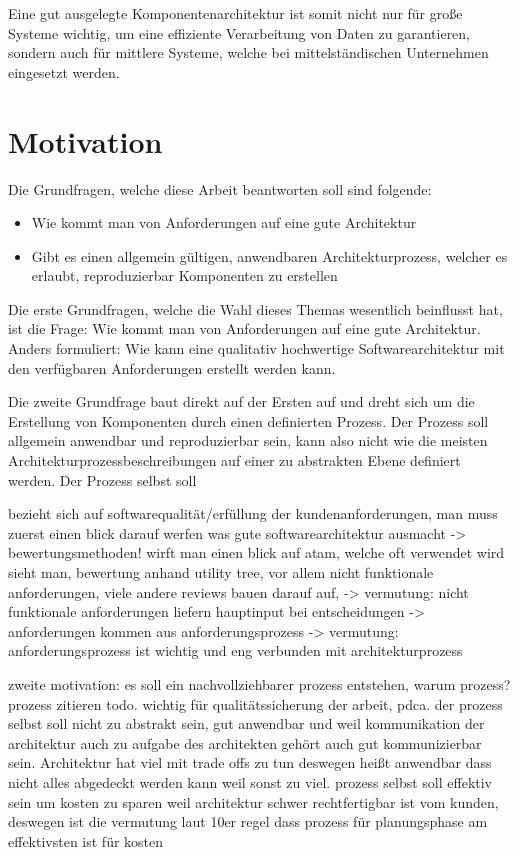 Eine gut ausgelegte Komponentenarchitektur ist somit nicht nur für große Systeme wichtig, um eine effiziente Verarbeitung von Daten zu garantieren, sondern auch für mittlere Systeme, welche bei mittelständischen Unternehmen eingesetzt werden.

\section{Motivation}
Die Grundfragen, welche diese Arbeit beantworten soll sind folgende:

\begin{itemize}
  \item Wie kommt man von Anforderungen auf eine gute Architektur
  \item Gibt es einen allgemein gültigen, anwendbaren Architekturprozess, welcher es erlaubt, reproduzierbar Komponenten zu erstellen
\end{itemize}

Die erste Grundfragen, welche die Wahl dieses Themas wesentlich beinflusst hat, ist die Frage: Wie kommt man von Anforderungen auf eine gute Architektur. Anders formuliert: Wie kann eine qualitativ hochwertige Softwarearchitektur mit den verfügbaren Anforderungen erstellt werden kann.

Die zweite Grundfrage baut direkt auf der Ersten auf und dreht sich um die Erstellung von Komponenten durch einen definierten Prozess. Der Prozess soll allgemein anwendbar und reproduzierbar sein, kann also nicht wie die meisten Architekturprozessbeschreibungen auf einer zu abstrakten Ebene definiert werden. Der Prozess selbst soll

bezieht sich auf softwarequalität/erfüllung der kundenanforderungen, man muss zuerst einen blick darauf werfen was gute softwarearchitektur ausmacht -> bewertungsmethoden! wirft man einen blick auf atam, welche oft verwendet wird sieht man, bewertung anhand utility tree, vor allem nicht funktionale anforderungen, viele andere reviews bauen darauf auf, -> vermutung: nicht funktionale anforderungen liefern hauptinput bei entscheidungen -> anforderungen kommen aus anforderungsprozess -> vermutung: anforderungsprozess ist wichtig und eng verbunden mit architekturprozess


zweite motivation: es soll ein nachvollziehbarer prozess entstehen, warum prozess? prozess zitieren todo. wichtig für qualitätssicherung der arbeit, pdca. der prozess selbst soll nicht zu abstrakt sein, gut anwendbar und weil kommunikation der architektur auch zu aufgabe des architekten gehört auch gut kommunizierbar sein. Architektur hat viel mit trade offs zu tun deswegen heißt anwendbar dass nicht alles abgedeckt werden kann weil sonst zu viel. prozess selbst soll effektiv sein um kosten zu sparen weil architektur schwer rechtfertigbar ist vom kunden, deswegen ist die vermutung laut 10er regel dass prozess für planungsphase am effektivsten ist für kosten

